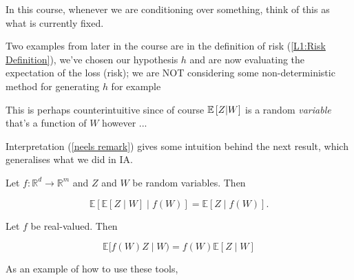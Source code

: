 \documentclass[11pt]{scrartcl}
\begin{document}
\begin{remark}
In this course, whenever we are conditioning over something, think of this as what is currently fixed.

Two examples from later in the course are in the definition of risk (\ref{L1:Risk Definition}), we've chosen our hypothesis $h$ and are now evaluating the expectation of the loss (risk); we are NOT considering some non-deterministic method for generating $h$ for example

This is perhaps counterintuitive since of course $\mathbb{E} \left[ Z|W \right]$ is a random \textit{variable} that's a function of $W$ however ...
\end{remark}

Interpretation (\ref{neels remark}) gives some intuition behind the next result, which generalises what we did in IA.

\begin{theorem}
Let $f : \mathbb{R}^d \rightarrow \mathbb{R}^m$ and $Z$ and $W$ be random variables. Then 

\begin{equation}
\mathbb{E}[\mathbb{E}[Z\mid W]\mid f(W)] = \mathbb{E}[Z\mid f(W)].
\end{equation}
\end{theorem}

\begin{theorem}
Let $f$ be real-valued. Then

\begin{equation}
    \mathbb{E}[f(W)Z\mid W) = f(W)\mathbb{E}[Z\mid W]
\end{equation}
\label{L1: Taking out}
\end{theorem}

As an example of how to use these tools,
\end{document}
